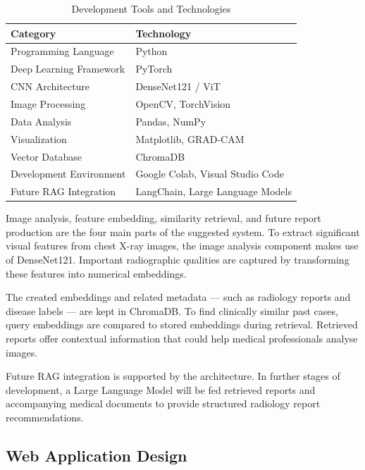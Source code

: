\vspace{1em}
\begin{table}[H]
    \centering
    \caption{Development Tools and Technologies}
    \label{tab:tools}
    \begin{tabular}{ll}
        \toprule
        \textbf{Category} & \textbf{Technology} \\
        \midrule
        Programming Language      & Python \\
        Deep Learning Framework   & PyTorch \\
        CNN Architecture          & DenseNet121 / ViT \\
        Image Processing          & OpenCV, TorchVision \\
        Data Analysis             & Pandas, NumPy \\
        Visualization             & Matplotlib, GRAD-CAM \\
        Vector Database           & ChromaDB \\
        Development Environment   & Google Colab, Visual Studio Code \\
        Future RAG Integration    & LangChain, Large Language Models \\
        \bottomrule
    \end{tabular}
\end{table}

Image analysis, feature embedding, similarity retrieval, and future report production are the
four main parts of the suggested system. To extract significant visual features from chest X-ray
images, the image analysis component makes use of DenseNet121. Important radiographic
qualities are captured by transforming these features into numerical embeddings.

The created embeddings and related metadata --- such as radiology reports and disease labels ---
are kept in ChromaDB. To find clinically similar past cases, query embeddings are compared to
stored embeddings during retrieval. Retrieved reports offer contextual information that could
help medical professionals analyse images.

Future RAG integration is supported by the architecture. In further stages of development, a
Large Language Model will be fed retrieved reports and accompanying medical documents to
provide structured radiology report recommendations.

\subsection{Web Application Design}


